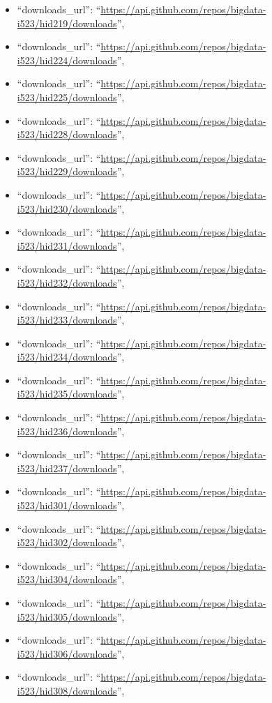 \begin{itemize}
\item
  ``downloads\_url'':
  ``\url{https://api.github.com/repos/bigdata-i523/hid219/downloads}'',
\item
  ``downloads\_url'':
  ``\url{https://api.github.com/repos/bigdata-i523/hid224/downloads}'',
\item
  ``downloads\_url'':
  ``\url{https://api.github.com/repos/bigdata-i523/hid225/downloads}'',
\item
  ``downloads\_url'':
  ``\url{https://api.github.com/repos/bigdata-i523/hid228/downloads}'',
\item
  ``downloads\_url'':
  ``\url{https://api.github.com/repos/bigdata-i523/hid229/downloads}'',
\item
  ``downloads\_url'':
  ``\url{https://api.github.com/repos/bigdata-i523/hid230/downloads}'',
\item
  ``downloads\_url'':
  ``\url{https://api.github.com/repos/bigdata-i523/hid231/downloads}'',
\item
  ``downloads\_url'':
  ``\url{https://api.github.com/repos/bigdata-i523/hid232/downloads}'',
\item
  ``downloads\_url'':
  ``\url{https://api.github.com/repos/bigdata-i523/hid233/downloads}'',
\item
  ``downloads\_url'':
  ``\url{https://api.github.com/repos/bigdata-i523/hid234/downloads}'',
\item
  ``downloads\_url'':
  ``\url{https://api.github.com/repos/bigdata-i523/hid235/downloads}'',
\item
  ``downloads\_url'':
  ``\url{https://api.github.com/repos/bigdata-i523/hid236/downloads}'',
\item
  ``downloads\_url'':
  ``\url{https://api.github.com/repos/bigdata-i523/hid237/downloads}'',
\item
  ``downloads\_url'':
  ``\url{https://api.github.com/repos/bigdata-i523/hid301/downloads}'',
\item
  ``downloads\_url'':
  ``\url{https://api.github.com/repos/bigdata-i523/hid302/downloads}'',
\item
  ``downloads\_url'':
  ``\url{https://api.github.com/repos/bigdata-i523/hid304/downloads}'',
\item
  ``downloads\_url'':
  ``\url{https://api.github.com/repos/bigdata-i523/hid305/downloads}'',
\item
  ``downloads\_url'':
  ``\url{https://api.github.com/repos/bigdata-i523/hid306/downloads}'',
\item
  ``downloads\_url'':
  ``\url{https://api.github.com/repos/bigdata-i523/hid308/downloads}'',

\end{itemize}
